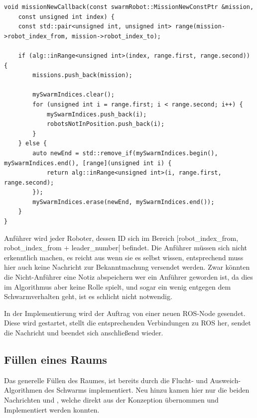 \begin{lstlisting}[style=cpp, title=Teilen des eigenen Schwarms nach dem Erhalt eines Auftrags]
void missionNewCallback(const swarmRobot::MissionNewConstPtr &mission,
	const unsigned int index) {
    const std::pair<unsigned int, unsigned int> range(mission->robot_index_from, mission->robot_index_to);

    if (alg::inRange<unsigned int>(index, range.first, range.second)) {
        missions.push_back(mission);

        mySwarmIndices.clear();
        for (unsigned int i = range.first; i < range.second; i++) {
            mySwarmIndices.push_back(i);
            robotsNotInPosition.push_back(i);
        }
    } else {
        auto newEnd = std::remove_if(mySwarmIndices.begin(), mySwarmIndices.end(), [range](unsigned int i) {
            return alg::inRange<unsigned int>(i, range.first, range.second);
        });
        mySwarmIndices.erase(newEnd, mySwarmIndices.end());
    }
}
\end{lstlisting}

Anführer wird jeder Roboter, dessen ID sich im Bereich [robot\_index\_from, robot\_index\_from + leader\_number[ befindet. Die Anführer müssen sich nicht erkenntlich machen, es reicht aus wenn sie es selbst wissen, entsprechend muss hier auch keine Nachricht zur Bekanntmachung versendet werden. Zwar könnten die Nicht-Anführer eine Notiz abspeichern wer ein Anführer geworden ist, da dies im Algorithmus aber keine Rolle spielt, und sogar ein wenig entgegen dem Schwarmverhalten geht, ist es schlicht nicht notwendig.

In der Implementierung wird der Auftrag von einer neuen \ac{ROS}-Node gesendet. Diese wird gestartet, stellt die entsprechenden Verbindungen zu \ac{ROS} her, sendet die Nachricht und beendet sich anschließend wieder.

\subsection*{Füllen eines Raums}

Das generelle Füllen des Raumes, ist bereits durch die Flucht- und Ausweich-Algorithmen des Schwarms implementiert. Neu hinzu kamen hier nur die beiden Nachrichten  und , welche direkt aus der Konzeption übernommen und Implementiert werden konnten.

